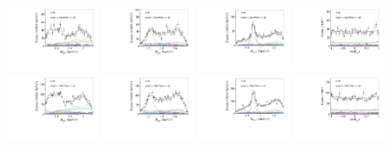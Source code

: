 \begin{figure}[htbp]\centering
    \includegraphics[width=0.24\textwidth]{figure/pwa_nominal/s7_m_R_BC.pdf}
    \includegraphics[width=0.24\textwidth]{figure/pwa_nominal/s7_m_R_BD.pdf}
    \includegraphics[width=0.24\textwidth]{figure/pwa_nominal/s7_m_R_CD.pdf}
    \includegraphics[width=0.24\textwidth]{figure/pwa_nominal/s7_epemDSID_Lmdc_cos_beta.pdf} \\
    \includegraphics[width=0.24\textwidth]{figure/pwa_nominal/s8_m_R_BC.pdf}
    \includegraphics[width=0.24\textwidth]{figure/pwa_nominal/s8_m_R_BD.pdf}
    \includegraphics[width=0.24\textwidth]{figure/pwa_nominal/s8_m_R_CD.pdf}
    \includegraphics[width=0.24\textwidth]{figure/pwa_nominal/s8_epemDSID_Lmdc_cos_beta.pdf} \\

\end{figure}
